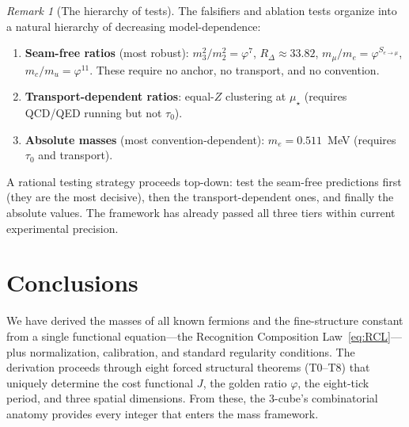 \documentclass[11pt,a4paper]{article}
\theoremstyle{definition}
\theoremstyle{remark}
\newtheorem{remark}[theorem]{Remark}
\newcommand{\phig}{\varphi}
\newcommand{\Jcost}{J}
\newcommand{\muStar}{\mu_{\star}}
\newcommand{\Zidx}{Z}
\begin{document}
\begin{remark}[The hierarchy of tests]
\label{rem:test_hierarchy}
The falsifiers and ablation tests organize into a natural hierarchy of
decreasing model-dependence:

\begin{enumerate}[nosep]
  \item \textbf{Seam-free ratios} (most robust): $m_3^2/m_2^2 = \phig^7$,
    $R_\Delta \approx 33.82$, $m_\mu/m_e = \phig^{S_{e\to\mu}}$,
    $m_c/m_u = \phig^{11}$.  These require no anchor, no transport, and no
    convention.

  \item \textbf{Transport-dependent ratios}: equal-$\Zidx$ clustering at
    $\muStar$ (requires QCD/QED running but not $\tau_0$).

  \item \textbf{Absolute masses} (most convention-dependent): $m_e = 0.511$~MeV
    (requires $\tau_0$ and transport).
\end{enumerate}

\noindent
A rational testing strategy proceeds top-down: test the seam-free
predictions first (they are the most decisive), then the transport-dependent
ones, and finally the absolute values.  The framework has already passed all
three tiers within current experimental precision.
\end{remark}


\section{Conclusions}
\label{sec:conclusions}

We have derived the masses of all known fermions and the fine-structure
constant from a single functional equation---the Recognition Composition
Law~\eqref{eq:RCL}---plus normalization, calibration, and standard regularity
conditions.  The derivation proceeds through eight forced structural theorems
(T0--T8) that uniquely determine the cost functional $\Jcost$, the golden
ratio $\phig$, the eight-tick period, and three spatial dimensions.  From these,
the 3-cube's combinatorial anatomy provides every integer that enters the mass
framework.
\end{document}
